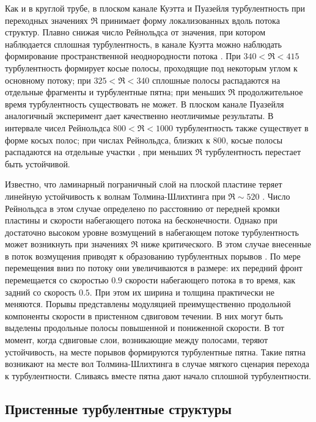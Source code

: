 Как и в круглой трубе, в плоском канале Куэтта \cite{Prigent2002, Barkley2005} и Пуазейля турбулентность при переходных значениях $\Re$ принимает форму локализованных вдоль потока структур. Плавно снижая число Рейнольдса от значения, при котором наблюдается сплошная турбулентность, в канале Куэтта можно наблюдать формирование пространственной неоднородности потока \cite{Duguet2010Couette}. При $340 < \Re < 415$ турбулентность формирует косые полосы, проходящие под некоторым углом к основному потоку; при $325 < \Re < 340$ сплошные полосы распадаются на отдельные фрагменты и турбулентные пятна; при меньших $\Re$ продолжительное время турбулентность существовать не может. В плоском канале Пуазейля аналогичный эксперимент дает качественно неотличимые результаты. В интервале чисел Рейнольдса $800 < \Re < 1000$ турбулентность также существует в форме косых полос; при числах Рейнольдса, близких к 800, косые полосы распадаются на отдельные участки \cite{Tuckerman2014, Lernoult2014, Sano2015}, при меньших $\Re$ турбулентность перестает быть устойчивой. 

Известно, что ламинарный пограничный слой на плоской пластине теряет линейную устойчивость к волнам Толмина-Шлихтинга при $\Re \sim 520$ \cite{Schlichting2004}. Число Рейнольдса в этом случае определено по расстоянию от передней кромки пластины и скорости набегающего потока на бесконечности. Однако при достаточно высоком уровне возмущений в набегающем потоке турбулентность может возникнуть при значениях $\Re$ ниже критического. В этом случае внесенные в поток возмущения приводят к образованию турбулентных порывов \cite{Katasonov2014}. По мере перемещения вниз по потоку они увеличиваются в размере: их передний фронт перемещается со скоростью $0.9$ скорости набегающего потока в то время, как задний со скорость $0.5$. При этом их ширина и толщина практически не меняются. Порывы представлены модуляцией преимущественно продольной компоненты скорости в пристенном сдвиговом течении. В них могут быть выделены продольные полосы повышенной и пониженной скорости. В тот момент, когда сдвиговые слои, возникающие между полосами, теряют устойчивость, на месте порывов формируются турбулентные пятна. Такие пятна возникают на месте вол Толмина-Шлихтинга в случае мягкого сценария перехода к турбулентности. Сливаясь вместе пятна дают начало сплошной турбулентности. 


	\subsection{Пристенные турбулентные структуры} \label{structure_subsection}


